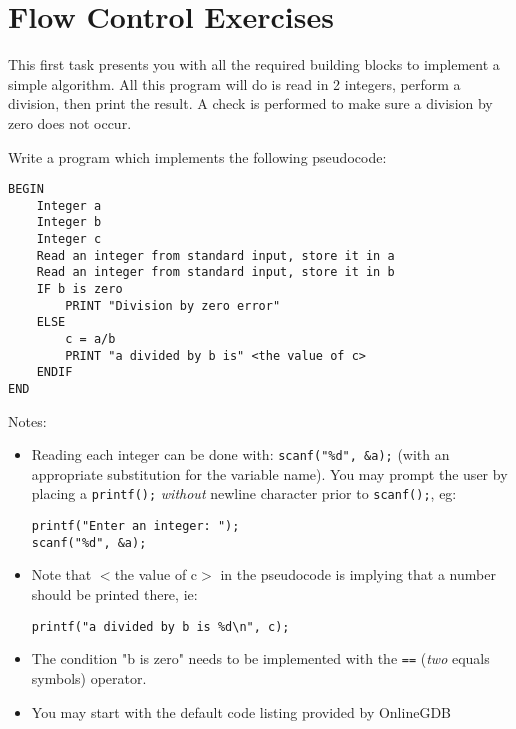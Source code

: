 \documentclass{lab}
\begin{document}
\pagebreak
\section{Flow Control Exercises}

This first task presents you with all the required building blocks to implement a simple algorithm. All this program will do is read in 2 integers, perform a division, then print the result. A check is performed to make sure a division by zero does not occur.

\begin{task}{}{}
Write a program which implements the following pseudocode:

\begin{lstlisting}[style=pseudo]
BEGIN 
	Integer a 
	Integer b
	Integer c
	Read an integer from standard input, store it in a
	Read an integer from standard input, store it in b
	IF b is zero
		PRINT "Division by zero error"
	ELSE
		c = a/b
		PRINT "a divided by b is" <the value of c>
	ENDIF
END
\end{lstlisting}

Notes:

\begin{itemize}
\item Reading each integer can be done with: \texttt{scanf("\%d", \&a);} (with an appropriate substitution for the variable name). You may prompt the user by placing a \texttt{printf();} \textit{without} newline character prior to \texttt{scanf();}, eg:

\begin{lstlisting}[style=CStyle]
printf("Enter an integer: ");
scanf("%d", &a);
\end{lstlisting}

\item Note that $<$the value of c$>$ in the pseudocode is implying that a number should be printed there, ie:

\begin{lstlisting}[style=CStyle]
printf("a divided by b is %d\n", c);
\end{lstlisting}

\item The condition "b is zero" needs to be implemented with the \texttt{==} (\textit{two} equals symbols) operator.

\item You may start with the default code listing provided by OnlineGDB
\end{itemize}
\end{task}
\end{document}
